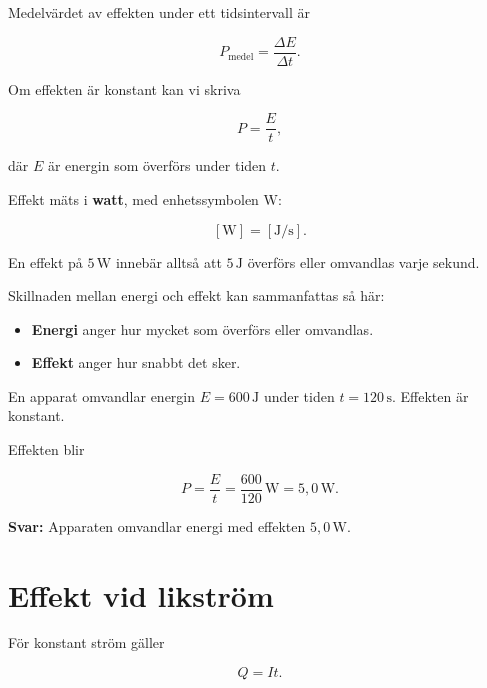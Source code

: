 \documentclass[
  swedish,
  11pt,
  a4paper,
  DIV=11,
  numbers=noendperiod,
  twoside,
  open=any]{scrreprt}
\providecommand{\tightlist}{%
  \setlength{\itemsep}{0pt}\setlength{\parskip}{0pt}}
\begin{document}
Medelvärdet av effekten under ett tidsintervall är

\[
P_\mathrm{medel} = \frac{\Delta E}{\Delta t}.
\]

Om effekten är konstant kan vi skriva

\[
\boxed{P = \frac{E}{t}},
\]

där \(E\) är energin som överförs under tiden \(t\).

Effekt mäts i \textbf{watt}, med enhetssymbolen \(\mathrm{W}\):

\[
[\mathrm{W}] = [\mathrm{J/s}].
\]

En effekt på \(5\,\mathrm{W}\) innebär alltså att \(5\,\mathrm{J}\)
överförs eller omvandlas varje sekund.

Skillnaden mellan energi och effekt kan sammanfattas så här:

\begin{itemize}
\tightlist
\item
  \textbf{Energi} anger hur mycket som överförs eller omvandlas.
\item
  \textbf{Effekt} anger hur snabbt det sker.
\end{itemize}

\begin{tcolorbox}[enhanced jigsaw, arc=.35mm, bottomrule=.15mm, bottomtitle=1mm, breakable, colback=white, colbacktitle=quarto-callout-note-color!10!white, colframe=quarto-callout-note-color-frame, coltitle=black, left=2mm, leftrule=.75mm, opacityback=0, opacitybacktitle=0.6, rightrule=.15mm, title={Exempel: energi och effekt}, titlerule=0mm, toprule=.15mm, toptitle=1mm]

En apparat omvandlar energin \(E = 600\,\mathrm{J}\) under tiden
\(t = 120\,\mathrm{s}\). Effekten är konstant.

Effekten blir

\[
P = \frac{E}{t}
= \frac{600}{120}\,\mathrm{W}
= 5{,}0\,\mathrm{W}.
\]

\textbf{Svar:} Apparaten omvandlar energi med effekten
\(5{,}0\,\mathrm{W}\).

\end{tcolorbox}

\section{Effekt vid likström}\label{sec-effekt-effekt-vid-likstrom}

För konstant ström gäller

\[
Q = It.
\]
\end{document}
